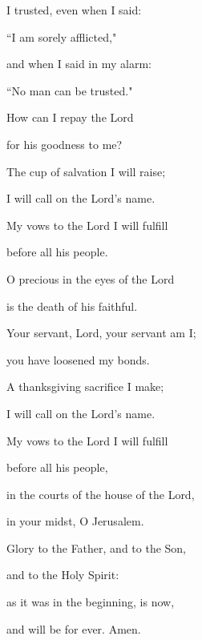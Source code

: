 \noindent I trusted, even when I said:~\GreStar{}~\nopagebreak

``I am sorely afflicted,"

\noindent and when I said in my alarm:~\GreStar{}~\nopagebreak

``No man can be trusted."

\noindent How can I repay the Lord~\GreStar{}~\nopagebreak

for his goodness to me?

\noindent The cup of salvation I will raise;~\GreStar{}~\nopagebreak

I will call on the Lord’s name.

\noindent My vows to the Lord I will fulfill~\GreStar{}~\nopagebreak

before all his people.

\noindent O precious in the eyes of the Lord~\GreStar{}~\nopagebreak

is the death of his faithful.

\noindent Your servant, Lord, your servant am I;~\GreStar{}~\nopagebreak

you have loosened my bonds.

\noindent A thanksgiving sacrifice I make;~\GreStar{}~\nopagebreak

I will call on the Lord’s name.

\noindent My vows to the Lord I will fulfill~\GreStar{}~\nopagebreak

before all his people,

\noindent in the courts of the house of the Lord,~\GreStar{}~\nopagebreak

in your midst, O Jerusalem.

\noindent Glory to the Father, and to the Son,~\GreStar{}~\nopagebreak

and to the Holy Spirit:

\noindent as it was in the beginning, is now,~\GreStar{}~\nopagebreak

and will be for ever. Amen.
